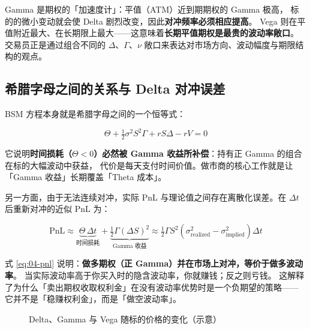 \begin{keybox}
Gamma 是期权的「加速度计」：平值（ATM）近到期期权的 Gamma 极高，
标的的微小变动就会使 Delta 剧烈改变，因此\textbf{对冲频率必须相应提高}。
Vega 则在平值附近最大、在长期限上最大——这意味着\textbf{长期平值期权是最贵的波动率敞口}。
交易员正是通过组合不同的 $\Delta$、$\Gamma$、$\nu$ 敞口来表达对市场方向、波动幅度与期限结构的观点。
\end{keybox}

\subsection{希腊字母之间的关系与 Delta 对冲误差}

BSM 方程本身就是希腊字母之间的一个恒等式：

\begin{equation}
  \Theta + \tfrac12\sigma^2S^2\Gamma + rS\Delta - rV = 0
  \label{eq:04-greek-identity}
\end{equation}

它说明\textbf{时间损耗（$\Theta<0$）必然被 Gamma 收益所补偿}：持有正 Gamma 的组合在标的大幅波动中获益，
代价是每天支付时间价值。做市商的核心工作就是让「Gamma 收益」长期覆盖「Theta 成本」。

另一方面，由于无法连续对冲，实际 PnL 与理论值之间存在离散化误差。在 $\Delta t$ 后重新对冲的近似 PnL 为：

\begin{equation}
  \text{PnL} \approx \underbrace{\Theta\,\Delta t}_{\text{时间损耗}}
   + \underbrace{\tfrac12\Gamma\left(\Delta S\right)^2}_{\text{Gamma 收益}}
   \approx \tfrac12\Gamma S^2\left(\sigma_{\text{realized}}^2 - \sigma_{\text{implied}}^2\right)\Delta t
  \label{eq:04-pnl}
\end{equation}

\begin{intuitionbox}
式 \cref{eq:04-pnl} 说明：\textbf{做多期权（正 Gamma）并在市场上对冲，等价于做多波动率}。
当实际波动率高于你买入时的隐含波动率，你就赚钱；反之则亏钱。
这解释了为什么「卖出期权收取权利金」在没有波动率优势时是一个负期望的策略——
它并不是「稳赚权利金」，而是「做空波动率」。
\end{intuitionbox}

\begin{figure}[htbp]
\centering
{}
\caption{Delta、Gamma 与 Vega 随标的价格的变化（示意）}\label{fig:04-greeks}
\end{figure}

